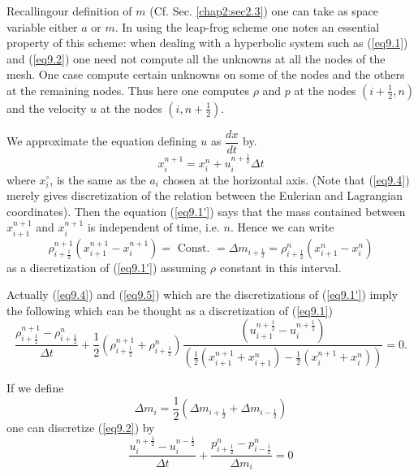 Recalling\pageoriginale our definition of $m$
(Cf. Sec. \ref{chap2:sec2.3}) one can take as space variable either
$a$ or $m$. In using the leap-frog scheme one notes an essential
property of this scheme: when dealing with a hyperbolic system such as
(\ref{eq9.1}) and (\ref{eq9.2}) one need not compute all the unknowns
at all the nodes  of the mesh. One case compute certain unknowns on
some of the nodes and the others at the remaining nodes. Thus here one
computes $\rho$ and $p$ at the nodes $\left(i+\frac{1}{2}, n\right)$ and the
velocity $u$ at the nodes $(i, n+\frac{1}{2})$. 

We approximate the equation defining $u$ as $\dfrac{dx}{dt}$ by.
\begin{equation*}
x^{n+1}_i = x^n_i + u^{n+\frac{1}{2}}_i \Delta t \tag{9.4}\label{eq9.4}
\end{equation*}
where $x^\circ_i$, is the same as the $a_i$ chosen at the horizontal axis. (Note that (\ref{eq9.4}) merely gives discretization of the relation between the Eulerian and Lagrangian coordinates). Then the equation (\ref{eq9.1'}) says that the mass contained between $x^{n+1}_{i+1}$ and $x^{n+1}_i$ is independent of time, i.e. $n$. Hence we can write 
\begin{equation*}
\rho^{n+1}_{i+\frac{1}{2}} (x^{n+1}_{i+1} - x^{n+1}_i) = \text{ Const. } = \Delta m_{i+\frac{1}{2}} = \rho^n_{i+\frac{1}{2}} (x^n_{i+1} - x^n_i)\tag{9.5}\label{eq9.5}
\end{equation*}
as a discretization of (\ref{eq9.1'}) assuming $\rho$ constant in this interval.

Actually (\ref{eq9.4}) and (\ref{eq9.5}) which are the discretizations of (\ref{eq9.1'}) imply the following which can be thought as a discretization of (\ref{eq9.1})
\begin{equation*}
\frac{\rho^{n+1}_{i+\frac{1}{2}} - \rho^n_{i+\frac{1}{2}}}{\Delta t} + \frac{1}{2}
 (\rho^{n+1}_{i+\frac{1}{2}} + \rho^n_{i+\frac{1}{2}})  \frac{(u^{n+\frac{1}{2}}_{i+1} - u^{n+\frac{1}{2}}_i)}{(\frac{1}{2} (x^{n+1}_{i+1} + x^n_{i+1}) -\frac{1}{2} (x^{n+1}_i + x^n_i))} =0.\tag{9.6}\label{eq9.6}
\end{equation*}

If we define 
\begin{equation*}
\Delta m_i = \frac{1}{2} (\Delta m_{i+\frac{1}{2}} + \Delta m_{i-\frac{1}{2}})\tag{9.7}\label{eq9.7}
\end{equation*}
one can discretize (\ref{eq9.2}) by
\begin{equation*}
\frac{u^{n+\frac{1}{2}}_i - u^{n-\frac{1}{2}}_i}{\Delta t} + \frac{p^n_{i+\frac{1}{2}} - p^n_{i-\frac{1}{2}}}{\Delta m_i} = 0\tag{9.8}\label{eq9.8}
\end{equation*}\pageoriginale 

